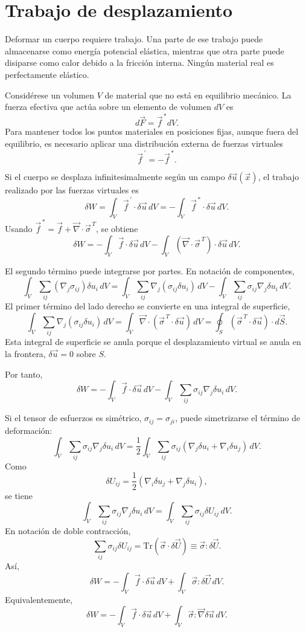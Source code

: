 \section{Trabajo de desplazamiento}

Deformar un cuerpo requiere trabajo. Una parte de ese trabajo puede almacenarse como energía potencial elástica, mientras que otra parte puede disiparse como calor debido a la fricción interna. Ningún material real es perfectamente elástico.

Considérese un volumen $V$ de material que no está en equilibrio mecánico. La fuerza efectiva que actúa sobre un elemento de volumen $dV$ es
$$ d\vec{F} = \vec{f}^{\,*} dV. $$
Para mantener todos los puntos materiales en posiciones fijas, aunque fuera del equilibrio, es necesario aplicar una distribución externa de fuerzas virtuales
$$ \vec{f}^{\,\prime} = -\vec{f}^{\,*}. $$

Si el cuerpo se desplaza infinitesimalmente según un campo $\delta\vec{u}(\vec{x})$, el trabajo realizado por las fuerzas virtuales es
$$ \delta W = \int_V \vec{f}^{\,\prime}\cdot \delta\vec{u}\,dV = -\int_V \vec{f}^{\,*}\cdot\delta\vec{u}\,dV. $$
Usando $\vec{f}^{\,*} = \vec{f} + \vec{\nabla}\cdot\vec{\sigma}^{\,T}$, se obtiene
$$ \delta W = -\int_V \vec{f}\cdot\delta\vec{u}\,dV - \int_V \left(\vec{\nabla}\cdot\vec{\sigma}^{\,T}\right)\cdot\delta\vec{u}\,dV. $$

El segundo término puede integrarse por partes. En notación de componentes,
$$ \int_V \sum_{ij}(\nabla_j \sigma_{ij})\delta u_i\,dV = \int_V \sum_{ij}\nabla_j(\sigma_{ij}\delta u_i)\,dV - \int_V \sum_{ij}\sigma_{ij}\nabla_j\delta u_i\,dV. $$
El primer término del lado derecho se convierte en una integral de superficie,
$$ \int_V \sum_{ij}\nabla_j(\sigma_{ij}\delta u_i)\,dV = \int_V \vec{\nabla}\cdot(\vec{\sigma}^{\,T}\cdot\delta\vec{u})\,dV = \oint_S (\vec{\sigma}^{\,T}\cdot\delta\vec{u})\cdot d\vec{S}. $$
Esta integral de superficie se anula porque el desplazamiento virtual se anula en la frontera, $\delta\vec{u}=0$ sobre $S$.

Por tanto,
$$ \delta W = -\int_V \vec{f}\cdot\delta\vec{u}\,dV - \int_V \sum_{ij}\sigma_{ij}\nabla_j\delta u_i\,dV. $$

Si el tensor de esfuerzos es simétrico, $\sigma_{ij}=\sigma_{ji}$, puede simetrizarse el término de deformación:
$$ \int_V \sum_{ij}\sigma_{ij}\nabla_j\delta u_i\,dV = \frac{1}{2}\int_V \sum_{ij}\sigma_{ij}(\nabla_j\delta u_i + \nabla_i\delta u_j)\,dV. $$
Como
$$ \delta U_{ij} = \frac{1}{2}(\nabla_i\delta u_j + \nabla_j\delta u_i), $$
se tiene
$$ \int_V \sum_{ij}\sigma_{ij}\nabla_j\delta u_i\,dV = \int_V \sum_{ij}\sigma_{ij}\delta U_{ij}\,dV. $$
En notación de doble contracción,
$$ \sum_{ij}\sigma_{ij}\delta U_{ij} = \mathrm{Tr}(\vec{\sigma}\cdot\delta\vec{U}) \equiv \vec{\sigma}:\delta\vec{U}. $$
Así,
$$ \delta W = -\int_V \vec{f}\cdot\delta\vec{u}\,dV + \int_V \vec{\sigma}:\delta\vec{U}\,dV. $$
Equivalentemente,
$$ \delta W = -\int_V \vec{f}\cdot\delta\vec{u}\,dV + \int_V \vec{\sigma}:\vec{\nabla}\delta\vec{u}\,dV. $$

